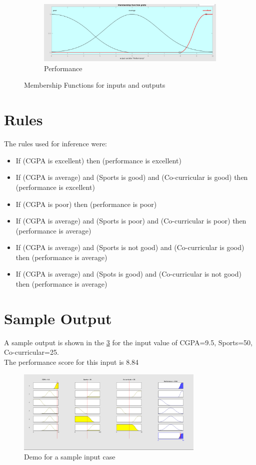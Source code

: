 \documentclass{article}
\begin{document}
\begin{figure}
	\begin{subfigure}[ht]{0.475\textwidth}   
		\centering 
		\includegraphics[width=\textwidth,height=0.25\textheight]{imgs/performance.png}
		\caption{Performance\label{fig:performance}}            
	\end{subfigure}
	\caption{Membership Functions for inputs and outputs\label{fig:membership}}
\end{figure}
\pagebreak

\section{Rules}

The rules used for inference were:

\begin{itemize}

	\item If (CGPA is excellent) then (performance is excellent)
	\item If (CGPA is average) and (Sports is good) and (Co-curricular is good) then (performance is excellent)
	\item If (CGPA is poor) then (performance is poor)
	\item If (CGPA is average) and (Sports is poor) and (Co-curricular is poor) then (performance is average)
	\item If (CGPA is average) and (Sports is not good) and (Co-curricular is good) then (performance is average)
	\item If (CGPA is average) and (Spots is good) and (Co-curricular is not good) then (performance is average)
	
\end{itemize}


\section{Sample Output}

A sample output is shown in the \cref{fig:demo} for the input value of CGPA=9.5, Sports=50, Co-curricular=25.
\\The performance score for this input is 8.84

\begin{figure}[H]
	\centering
   \includegraphics[width=0.8\textwidth,height=0.3\textheight]{imgs/demo.png}
	\caption{Demo for a sample input case\label{fig:demo}}
   \centering
\end{figure}
\end{document}
